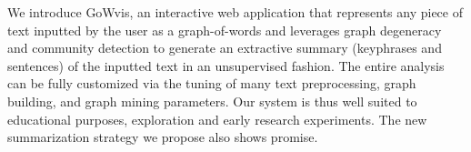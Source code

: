 We introduce GoWvis, an interactive web application that represents any piece of text inputted by the user as a graph-of-words and leverages graph degeneracy and community detection to generate an extractive summary (keyphrases and sentences) of the inputted text in an unsupervised fashion. The entire analysis can be fully customized via the tuning of many text preprocessing, graph building, and graph mining parameters. Our system is thus well suited to educational purposes, exploration and early research experiments. The new summarization strategy we propose also shows promise.
